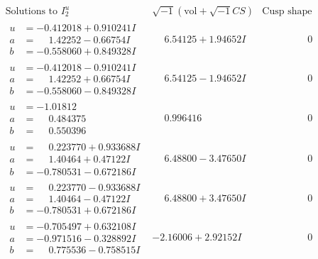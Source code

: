 \documentclass[1p]{elsarticle_modified}
\theoremstyle{definition}
\newcommand{\I}{\sqrt{-1}}
\begin{document}
$$\begin{array}{c|c|c}  
\text{Solutions to }I^u_{2}& \I (\text{vol} + \sqrt{-1}CS) & \text{Cusp shape}\\
 \hline 
\begin{aligned}
u &= -0.412018 + 0.910241 I \\
a &= \phantom{-}1.42252 - 0.66754 I \\
b &= -0.558060 + 0.849328 I\end{aligned}
 & \phantom{-}6.54125 + 1.94652 I & \phantom{-0.000000 } 0 \\ \hline\begin{aligned}
u &= -0.412018 - 0.910241 I \\
a &= \phantom{-}1.42252 + 0.66754 I \\
b &= -0.558060 - 0.849328 I\end{aligned}
 & \phantom{-}6.54125 - 1.94652 I & \phantom{-0.000000 } 0 \\ \hline\begin{aligned}
u &= -1.01812\phantom{ +0.000000I} \\
a &= \phantom{-}0.484375\phantom{ +0.000000I} \\
b &= \phantom{-}0.550396\phantom{ +0.000000I}\end{aligned}
 & \phantom{-}0.996416\phantom{ +0.000000I} & \phantom{-0.000000 } 0 \\ \hline\begin{aligned}
u &= \phantom{-}0.223770 + 0.933688 I \\
a &= \phantom{-}1.40464 + 0.47122 I \\
b &= -0.780531 - 0.672186 I\end{aligned}
 & \phantom{-}6.48800 - 3.47650 I & \phantom{-0.000000 } 0 \\ \hline\begin{aligned}
u &= \phantom{-}0.223770 - 0.933688 I \\
a &= \phantom{-}1.40464 - 0.47122 I \\
b &= -0.780531 + 0.672186 I\end{aligned}
 & \phantom{-}6.48800 + 3.47650 I & \phantom{-0.000000 } 0 \\ \hline\begin{aligned}
u &= -0.705497 + 0.632108 I \\
a &= -0.971516 - 0.328892 I \\
b &= \phantom{-}0.775536 - 0.758515 I\end{aligned}
 & -2.16006 + 2.92152 I & \phantom{-0.000000 } 0 \\ \hline\begin{aligned}

\end{aligned}
\end{array}$$
\end{document}
